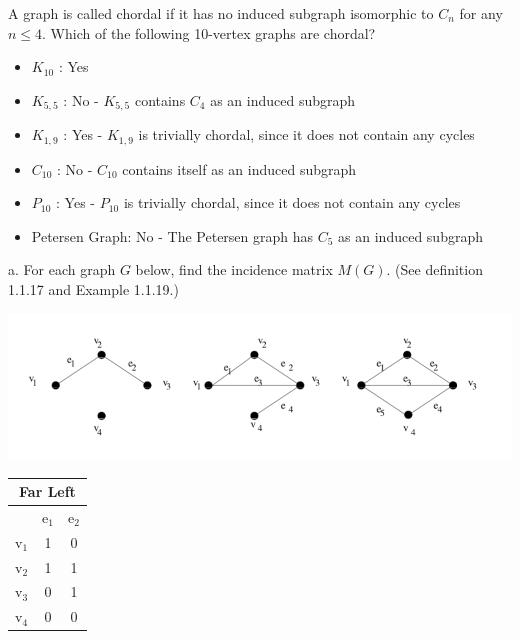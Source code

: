 \documentclass[12pt]{article}
\newenvironment{question}[2][Question]{\begin{trivlist}
\item[\hskip \labelsep {\bfseries #1}\hskip \labelsep {\bfseries #2.}]}{\end{trivlist}}
\begin{document}
\begin{question}{7}
A graph is called chordal if it has no induced subgraph isomorphic to $C_{n}$ for any $n \leq 4$. Which of the following 10-vertex graphs are chordal?
\end{question}

\begin{itemize}
\item $K_{10}$ \hspace{3mm}: Yes 
\item $K_{5,5}$ \hspace{2mm}: No - $K_{5,5}$ contains $C_4$ as an induced subgraph
\item $K_{1,9}$ \hspace{2mm}: Yes - $K_{1,9}$ is trivially chordal, since it does not contain any cycles
\item $C_{10}$ \hspace{3mm}: No - $C_{10}$ contains itself as an induced subgraph
\item $P_{10}$ \hspace{3mm}: Yes - $P_{10}$ is trivially chordal, since it does not contain any cycles
\item Petersen Graph: No - The Petersen graph has $C_5$ as an induced subgraph
\end{itemize}

\begin{question}{8}
a. For each graph $G$ below, find the incidence matrix $M(G)$. (See definition 1.1.17 and Example 1.1.19.)
\begin{center}
\includegraphics{q8.png}
\end{center}
\end{question}

\begin{tabular}{|c|c|c|} 
\multicolumn{3}{c}{Far Left}  \\ \hline
 & e$_1$ & e$_2$ \\ \hline
v$_1$ & 1 & 0 \\ \hline
v$_2$ & 1 & 1 \\ \hline
v$_3$ & 0 & 1 \\ \hline
v$_4$ & 0 & 0 \\ \hline
\end{tabular}
\end{document}
